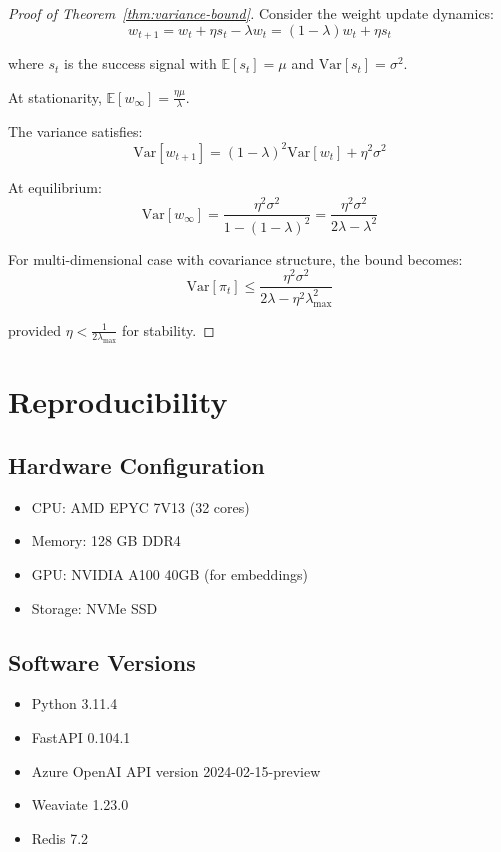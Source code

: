 \documentclass[11pt,a4paper]{article}
\theoremstyle{definition}
\theoremstyle{remark}
\begin{document}
\begin{proof}[Proof of Theorem~\ref{thm:variance-bound}]
Consider the weight update dynamics:
\[
w_{t+1} = w_t + \eta s_t - \lambda w_t = (1-\lambda)w_t + \eta s_t
\]

where $s_t$ is the success signal with $\mathbb{E}[s_t] = \mu$ and $\text{Var}[s_t] = \sigma^2$.

At stationarity, $\mathbb{E}[w_\infty] = \frac{\eta \mu}{\lambda}$.

The variance satisfies:
\[
\text{Var}[w_{t+1}] = (1-\lambda)^2 \text{Var}[w_t] + \eta^2 \sigma^2
\]

At equilibrium:
\[
\text{Var}[w_\infty] = \frac{\eta^2 \sigma^2}{1-(1-\lambda)^2} = \frac{\eta^2 \sigma^2}{2\lambda - \lambda^2}
\]

For multi-dimensional case with covariance structure, the bound becomes:
\[
\text{Var}[\pi_t] \leq \frac{\eta^2 \sigma^2}{2\lambda - \eta^2 \lambda_{\max}^2}
\]

provided $\eta < \frac{1}{2\lambda_{\max}}$ for stability.
\end{proof}

\section{Reproducibility}
\label{sec:reproducibility}

\subsection{Hardware Configuration}

\begin{itemize}
    \item CPU: AMD EPYC 7V13 (32 cores)
    \item Memory: 128 GB DDR4
    \item GPU: NVIDIA A100 40GB (for embeddings)
    \item Storage: NVMe SSD
\end{itemize}

\subsection{Software Versions}

\begin{itemize}
    \item Python 3.11.4
    \item FastAPI 0.104.1
    \item Azure OpenAI API version 2024-02-15-preview
    \item Weaviate 1.23.0
    \item Redis 7.2
\end{itemize}
\end{document}

